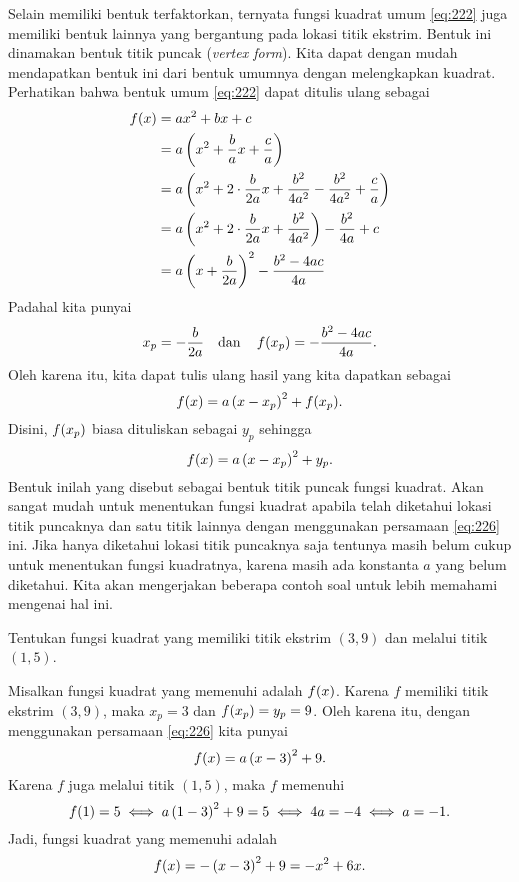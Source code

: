 	\par Selain memiliki bentuk terfaktorkan, ternyata fungsi kuadrat umum \ref{eq:222} juga memiliki bentuk lainnya yang bergantung pada lokasi titik ekstrim. Bentuk ini dinamakan bentuk titik puncak (\textit{vertex form}). Kita dapat dengan mudah mendapatkan bentuk ini dari bentuk umumnya dengan melengkapkan kuadrat. Perhatikan bahwa bentuk umum \ref{eq:222} dapat ditulis ulang sebagai
	\begin{align*}
		\mathop{}\!{f}{\left({x}\right)} &= ax^{2} + bx + c \\
		&= a\left(x^{2} + \frac{b}{a}x + \frac{c}{a}\right) \\
		&= a\left(x^{2} + 2 \cdot \frac{b}{2a}x + \frac{b^{2}}{4a^{2}} - \frac{b^{2}}{4a^{2}} + \frac{c}{a}\right) \\
		&= a\left(x^{2} + 2 \cdot \frac{b}{2a}x + \frac{b^{2}}{4a^{2}}\right) - \frac{b^{2}}{4a} + c \\
		&= a\left(x + \frac{b}{2a}\right)^{2} - \frac{b^{2} - 4ac}{4a}
	\end{align*}
	Padahal kita punyai
	\[ x_{p} = -\frac{b}{2a} \quad \mbox{dan} \quad \mathop{}\!{f}{\left({x_{p}}\right)} = -\dfrac{b^{2} - 4ac}{4a}. \]
	Oleh karena itu, kita dapat tulis ulang hasil yang kita dapatkan sebagai
	\[ \mathop{}\!{f}{\left({x}\right)} = a\left(x - x_{p}\right)^{2} + \mathop{}\!{f}{\left({x_{p}}\right)}. \]
	Disini, $ \mathop{}\!{f}{\left({x_{p}}\right)} $ biasa dituliskan sebagai $ y_{p} $ sehingga
	\begin{equation} \label{eq:226}
		\mathop{}\!{f}{\left({x}\right)} = a\left(x - x_{p}\right)^{2} + y_{p}.
	\end{equation}
	Bentuk inilah yang disebut sebagai bentuk titik puncak fungsi kuadrat. Akan sangat mudah untuk menentukan fungsi kuadrat apabila telah diketahui lokasi titik puncaknya dan satu titik lainnya dengan menggunakan persamaan \ref{eq:226} ini. Jika hanya diketahui lokasi titik puncaknya saja tentunya masih belum cukup untuk menentukan fungsi kuadratnya, karena masih ada konstanta $ a $ yang belum diketahui. Kita akan mengerjakan beberapa contoh soal untuk lebih memahami mengenai hal ini.
	
	\begin{contoh}
		Tentukan fungsi kuadrat yang memiliki titik ekstrim $ \left(3, 9\right) $ dan melalui titik $ \left(1, 5\right) $.
	\end{contoh}
	\begin{jawab}
		Misalkan fungsi kuadrat yang memenuhi adalah $ \mathop{}\!{f}{\left({x}\right)} $. Karena $ f $ memiliki titik ekstrim $ \left(3, 9\right) $, maka $ x_{p} = 3 $ dan $ \mathop{}\!{f}{\left({x_{p}}\right)} = y_{p} = 9 $. Oleh karena itu, dengan menggunakan persamaan \ref{eq:226} kita punyai
		\[ \mathop{}\!{f}{\left({x}\right)} = a\left(x - 3\right)^{2} + 9. \]
		Karena $ f $ juga melalui titik $ \left(1, 5\right) $, maka $ f $ memenuhi
		\[ \mathop{}\!{f}{\left({1}\right)} = 5 \iff a\left(1 - 3\right)^{2} + 9 = 5 \iff 4a = -4 \iff a = -1. \]
		Jadi, fungsi kuadrat yang memenuhi adalah
		\[ \mathop{}\!{f}{\left({x}\right)} = -\left(x - 3\right)^{2} + 9 = -x^{2} + 6x. \]
	\end{jawab}
	
